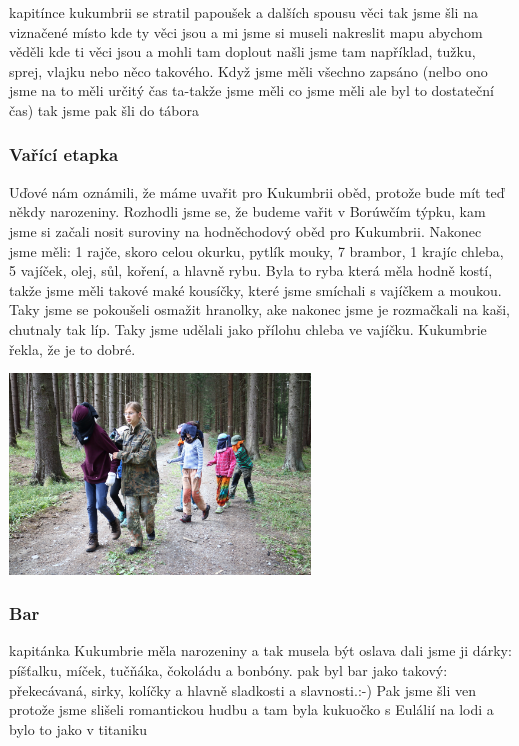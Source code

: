 kapitínce kukumbrii se stratil papoušek a dalších spousu věci tak jsme šli na viznačené místo kde ty věci jsou a mi jsme si museli nakreslit mapu abychom věděli kde ti věci jsou a mohli tam doplout našli jsme tam například, tužku, sprej, vlajku nebo něco takového. Když jsme měli všechno zapsáno (nelbo ono jsme na to měli určitý čas ta-takže jsme měli co jsme měli ale byl to dostateční čas) tak jsme pak šli do tábora


\subsubsection{Vařící etapka} %
\label{ssub:vařící_etapka}

Uďové nám oznámili, že máme uvařit pro Kukumbrii oběd, protože bude mít teď někdy narozeniny. Rozhodli jsme se, že budeme vařit v Borúwčím týpku, kam jsme si začali nosit suroviny na hodněchodový oběd pro Kukumbrii. Nakonec jsme měli: 1 rajče, skoro celou okurku, pytlík mouky, 7 brambor, 1 krajíc chleba, 5 vajíček, olej, sůl, koření, a hlavně rybu. Byla to ryba která měla hodně kostí, takže jsme měli takové maké kousíčky, které jsme smíchali s vajíčkem a moukou. Taky jsme se pokoušeli osmažit hranolky, ake nakonec jsme je rozmačkali na kaši, chutnaly tak líp. Taky jsme udělali jako přílohu chleba ve vajíčku. Kukumbrie řekla, že je to dobré.

\begin{center}
	\includegraphics[width=8cm]{img/anpetu_tabor/vorvo.JPG}
\end{center}

\subsubsection{Bar} %
\label{ssub:bar1}

kapitánka Kukumbrie měla narozeniny a tak musela být oslava dali jsme ji dárky: píšťalku, míček, tučňáka, čokoládu a bonbóny. pak byl bar jako takový: překecávaná, sirky, kolíčky a hlavně sladkosti a slavnosti.:-) Pak jsme šli ven protože jsme slišeli romantickou hudbu a tam byla kukuočko s Eulálií na lodi a bylo to jako v titaniku

